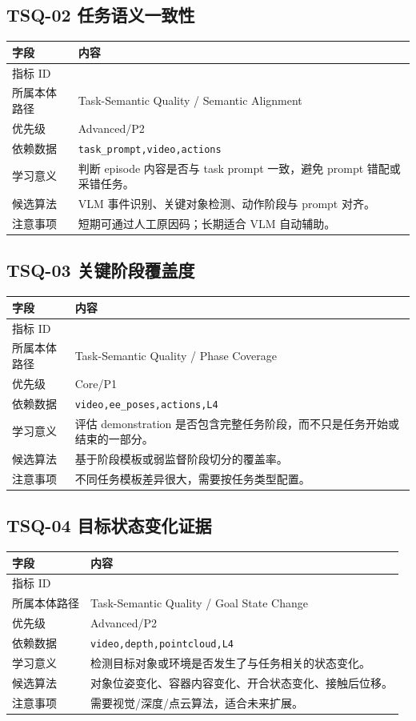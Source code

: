 \documentclass[UTF8,zihao=-4]{ctexart}
\newcommand{\Code}[1]{\texttt{#1}}
\newcommand{\MID}[1]{\texttt{\seqsplit{#1}}}
\begin{document}
\subsection{TSQ-02 任务语义一致性}

\begin{longtable}{L{3.6cm} L{9.6cm}}
\toprule
字段 & 内容 \\
\midrule
指标 ID & \MID{TSQ-02} \\
所属本体路径 & Task-Semantic Quality / Semantic Alignment \\
优先级 & Advanced/P2 \\
依赖数据 & \Code{task\_prompt,video,actions} \\
学习意义 & 判断 episode 内容是否与 task prompt 一致，避免 prompt 错配或采错任务。 \\
候选算法 & VLM 事件识别、关键对象检测、动作阶段与 prompt 对齐。 \\
注意事项 & 短期可通过人工原因码；长期适合 VLM 自动辅助。 \\
\bottomrule
\end{longtable}

\subsection{TSQ-03 关键阶段覆盖度}

\begin{longtable}{L{3.6cm} L{9.6cm}}
\toprule
字段 & 内容 \\
\midrule
指标 ID & \MID{TSQ-03} \\
所属本体路径 & Task-Semantic Quality / Phase Coverage \\
优先级 & Core/P1 \\
依赖数据 & \Code{video,ee\_poses,actions,L4} \\
学习意义 & 评估 demonstration 是否包含完整任务阶段，而不只是任务开始或结束的一部分。 \\
候选算法 & 基于阶段模板或弱监督阶段切分的覆盖率。 \\
注意事项 & 不同任务模板差异很大，需要按任务类型配置。 \\
\bottomrule
\end{longtable}

\subsection{TSQ-04 目标状态变化证据}

\begin{longtable}{L{3.6cm} L{9.6cm}}
\toprule
字段 & 内容 \\
\midrule
指标 ID & \MID{TSQ-04} \\
所属本体路径 & Task-Semantic Quality / Goal State Change \\
优先级 & Advanced/P2 \\
依赖数据 & \Code{video,depth,pointcloud,L4} \\
学习意义 & 检测目标对象或环境是否发生了与任务相关的状态变化。 \\
候选算法 & 对象位姿变化、容器内容变化、开合状态变化、接触后位移。 \\
注意事项 & 需要视觉/深度/点云算法，适合未来扩展。 \\
\bottomrule
\end{longtable}
\end{document}
